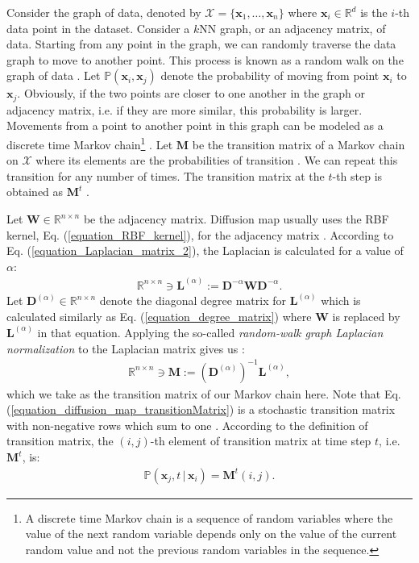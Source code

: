 \documentclass[lang=cn,10pt]{gorgeousnbook}
\numberwithin{equation}{section}%
\numberwithin{figure}{section}%
\begin{document}
Consider the graph of data, denoted by $\mathcal{X} = \{\boldsymbol{x}_1, \dots, \boldsymbol{x}_n\}$ where $\boldsymbol{x}_i \in \mathbb{R}^d$ is the $i$-th data point in the dataset. Consider a $k$NN graph, or an adjacency matrix, of data. Starting from any point in the graph, we can randomly traverse the data graph to move to another point. This process is known as a random walk on the graph of data \cite{de2008introduction}. Let $\mathbb{P}(\boldsymbol{x}_i, \boldsymbol{x}_j)$ denote the probability of moving from point $\boldsymbol{x}_i$ to $\boldsymbol{x}_j$. Obviously, if the two points are closer to one another in the graph or adjacency matrix, i.e. if they are more similar, this probability is larger. Movements from a point to another point in this graph can be modeled as a discrete time Markov chain\footnote{A discrete time Markov chain is a sequence of random variables where the value of the next random variable depends only on the value of the current random value and not the previous random variables in the sequence.} \cite{ross2014introduction}. Let $\boldsymbol{M}$ be the transition matrix of a Markov chain on $\mathcal{X}$ where its elements are the probabilities of transition \cite{ghojogh2019hidden}. We can repeat this transition for any number of times. The transition matrix at the $t$-th step is obtained as $\boldsymbol{M}^t$ \cite{ross2014introduction}. 

Let $\boldsymbol{W} \in \mathbb{R}^{n \times n}$ be the adjacency matrix. Diffusion map usually uses the RBF kernel, Eq. (\ref{equation_RBF_kernel}), for the adjacency matrix \cite{nadler2006diffusion,nadler2006diffusion2}. According to Eq. (\ref{equation_Laplacian_matrix_2}), the Laplacian is calculated for a value of $\alpha$:
\begin{align}
\mathbb{R}^{n \times n} \ni \boldsymbol{L}^{(\alpha)} := \boldsymbol{D}^{-\alpha} \boldsymbol{W} \boldsymbol{D}^{-\alpha}.
\end{align}
Let $\boldsymbol{D}^{(\alpha)} \in \mathbb{R}^{n \times n}$ denote the diagonal degree matrix for $\boldsymbol{L}^{(\alpha)}$ which is calculated similarly as Eq. (\ref{equation_degree_matrix}) where $\boldsymbol{W}$ is replaced by $\boldsymbol{L}^{(\alpha)}$ in that equation.
Applying the so-called \textit{random-walk graph Laplacian normalization} to the Laplacian matrix gives us \cite{chung1997spectral}:
\begin{align}\label{equation_diffusion_map_transitionMatrix}
\mathbb{R}^{n \times n} \ni \boldsymbol{M} := (\boldsymbol{D}^{(\alpha)})^{-1} \boldsymbol{L}^{(\alpha)}, 
\end{align}
which we take as the transition matrix of our Markov chain here. 
Note that Eq. (\ref{equation_diffusion_map_transitionMatrix}) is a stochastic transition matrix with
non-negative rows which sum to one \cite{brand2003continuous}. 
According to the definition of transition matrix, the $(i,j)$-th element of transition matrix at time step $t$, i.e. $\boldsymbol{M}^t$, is:
\begin{align}
\mathbb{P}(\boldsymbol{x}_j, t\, |\, \boldsymbol{x}_i) = \boldsymbol{M}^t(i,j).
\end{align}
\end{document}
